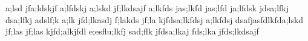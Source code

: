 a;lsd jfa;ldskjf a;lfdskj a;lskd jf;lkdsajf
a;lkfds jas;lkfd jas;lfd ja;lfdsk jdsa;lfkj
dsa;lfkj adslf;k a;lk jfd;lkasdj f;lakds jf;la
kjfdsa;lkfdsj a;lkfdsj dsafjasfdlkfda;lskd jf;las jf;las
kjfd;alkjfdl e;esflu;lkfj sad;flk jfdsa;lkaj
fds;lka jfds;lkdsajf
